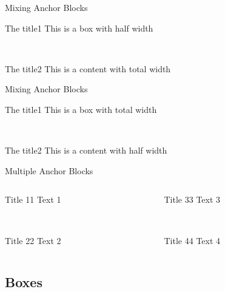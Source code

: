 \documentclass[english,sectioncirclenumberstyle]{ciadbeamer}
\begin{document}
\begin{frame}{Mixing Anchor Blocks}
	\begin{leftanchorblock}[.5\linewidth]{The title}{1}
		This is a box with half width
	\end{leftanchorblock} \\[.5cm]
	\begin{rightanchorblock}{The title}{2}
		This is a content with total width
	\end{rightanchorblock}
\end{frame}

\begin{frame}{Mixing Anchor Blocks \insertcontinuationtext}
	\begin{leftanchorblock}{The title}{1}
		This is a box with total width
	\end{leftanchorblock} \\[.5cm]
	\begin{rightanchorblock}[.5\linewidth]{The title}{2}
		This is a content with half width
	\end{rightanchorblock}
\end{frame}

\begin{frame}{Multiple Anchor Blocks}
	\begin{columns}
		\begin{column}{.5\linewidth}
			\begin{leftanchorblock}{Title 1}{1}
				Text 1
			\end{leftanchorblock} \\[.5cm]
			\begin{leftanchorblock}{Title 2}{2}
				Text 2
			\end{leftanchorblock}
		\end{column}
		\begin{column}{.5\linewidth}
			\begin{rightanchorblock}{Title 3}{3}
				Text 3
			\end{rightanchorblock} \\[.5cm]
			\begin{rightanchorblock}{Title 4}{4}
				Text 4
			\end{rightanchorblock}
		\end{column}
	\end{columns}
\end{frame}


\subsection{Boxes}
\tableofcontentslide[sectionstyle={show/shaded},subsectionstyle={show/shaded/hide},subsubsectionstyle={hide/hide/hide/hide},sections={3-}]
\end{document}
